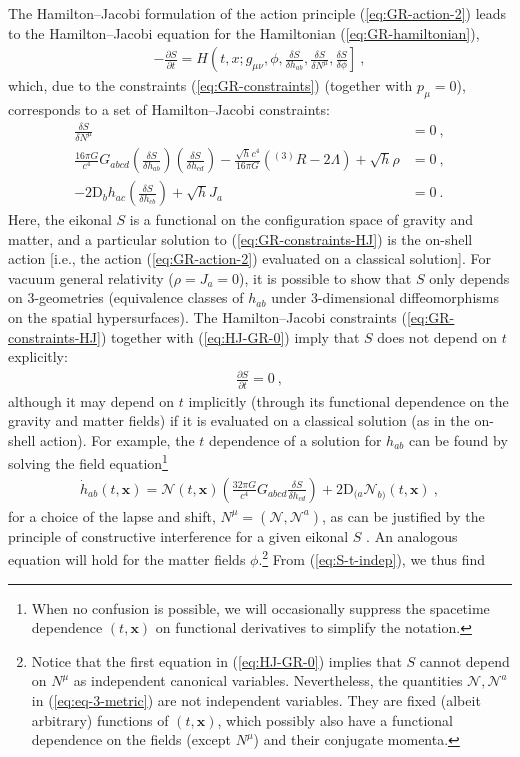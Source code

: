 \documentclass[12pt]{iopart}
\def\eq#1{\begin{equation}\begin{aligned}#1\end{aligned}\end{equation}}
\def\eref#1{(\ref{eq:#1})}
\def\del#1#2{\frac{\partial#1}{\partial#2}}
\def\N{\mathcal{N}}
\def\x{\mathbf{x}}
\begin{document}
The Hamilton--Jacobi formulation of the action principle \eref{GR-action-2} leads to the Hamilton--Jacobi equation for the Hamiltonian \eref{GR-hamiltonian},
\eq{\label{eq:HJ-GR-0}
-\del{S}{t} = H\left(t,x;g_{\mu\nu},\phi,\frac{\delta S}{\delta h_{ab}},\frac{\delta S}{\delta N^{\mu}},\frac{\delta S}{\delta \phi}\right] \ , 
}
which, due to the constraints \eref{GR-constraints} (together with $p_{\mu}=0$), corresponds to a set of Hamilton--Jacobi constraints:
\eq{\label{eq:GR-constraints-HJ}
\frac{\delta S}{\delta N^{\mu}} &=0 \ , \\
\frac{16\pi G}{c^4} G_{abcd}\left(\frac{\delta S}{\delta h_{ab}}\right)\left(\frac{\delta S}{\delta h_{cd}}\right)-\frac{\sqrt{h}c^4}{16\pi G}\left(^{(3)}R-2\Lambda\right)+\sqrt{h}\rho &= 0\ , \\
-2\mathrm{D}_b h_{ac}\left(\frac{\delta S}{\delta h_{cb}}\right)+\sqrt{h}J_a &= 0 \ .
}
Here, the eikonal $S$ is a functional on the configuration space of gravity and matter, and a particular solution to \eref{GR-constraints-HJ} is the on-shell action [i.e., the action \eref{GR-action-2} evaluated on a classical solution]. For vacuum general relativity ($\rho=J_a=0$), it is possible to show  \citep{Gerlach:1969ph} that $S$ only depends on $3$-geometries (equivalence classes of $h_{ab}$ under $3$-dimensional diffeomorphisms on the spatial hypersurfaces). The Hamilton--Jacobi constraints \eref{GR-constraints-HJ} together with \eref{HJ-GR-0} imply that $S$ does not depend on $t$ explicitly:
\eq{\label{eq:S-t-indep}
\del{S}{t} = 0 \ ,
}
although it may depend on $t$ implicitly (through its functional dependence on the gravity and matter fields) if it is evaluated on a classical solution (as in the on-shell action). For example, the $t$ dependence of a solution for $h_{ab}$ can be found by solving the field equation\footnote{When no confusion is possible, we will occasionally suppress the spacetime dependence $(t,\x)$ on functional derivatives to simplify the notation.}
\eq{\label{eq:eq-3-metric}
\dot{h}_{ab}(t,\x) = \N(t,\x)\left(\frac{32\pi G}{c^4}G_{abcd}\frac{\delta S}{\delta h_{cd}}\right)+2\mathrm{D}_{(a}\N_{b)}(t,\x) \ ,
}
for a choice of the lapse and shift, $N^{\mu} = (\N,\N^a)$, as can be justified by the principle of constructive interference for a given eikonal $S$ \citep{Gerlach:1969ph}. An analogous equation will hold for the matter fields $\phi$.\footnote{Notice that the first equation in \eref{HJ-GR-0} implies that $S$ cannot depend on $N^{\mu}$ as independent canonical variables. Nevertheless, the quantities $\N, \N^a$ in \eref{eq-3-metric} are not independent variables. They are fixed (albeit arbitrary) functions of $(t,\x)$, which possibly also have a functional dependence on the fields (except $N^{\mu}$) and their conjugate momenta.} From \eref{S-t-indep}, we thus find
\end{document}
